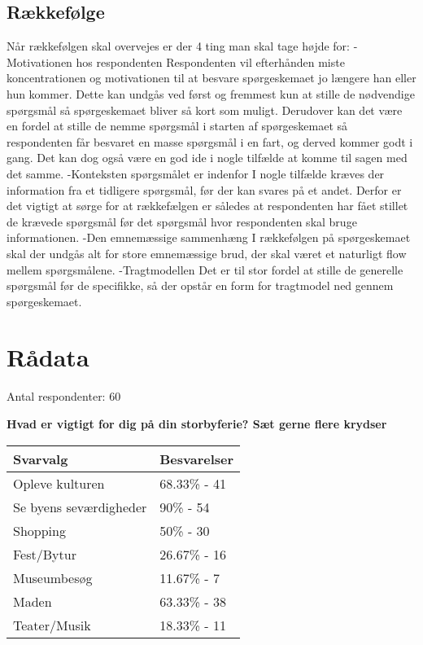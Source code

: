 \subsection{Rækkefølge}
Når rækkefølgen skal overvejes er der 4 ting man skal tage højde for: 
-Motivationen hos respondenten
Respondenten vil efterhånden miste koncentrationen og motivationen til at besvare spørgeskemaet jo længere han eller hun kommer. Dette kan undgås ved først og fremmest kun at stille de nødvendige spørgsmål så spørgeskemaet bliver så kort som muligt. Derudover kan det være en fordel at stille de nemme spørgsmål i starten af spørgeskemaet så respondenten får besvaret en masse spørgsmål i en fart, og derved kommer godt i gang. Det kan dog også være en god ide i nogle tilfælde at komme til sagen med det samme.
-Konteksten spørgsmålet er indenfor 
I nogle tilfælde kræves der information fra et tidligere spørgsmål, før der kan svares på et andet. Derfor er det vigtigt at sørge for at rækkefælgen er således at respondenten har fået stillet de krævede spørgsmål før det spørgsmål hvor respondenten skal bruge informationen.
-Den emnemæssige sammenhæng 
I rækkefølgen på spørgeskemaet skal der undgås alt for store emnemæssige brud, der skal været et naturligt flow mellem spørgsmålene.
-Tragtmodellen
Det er til stor fordel at stille de generelle spørgsmål før de specifikke, så der opstår en form for tragtmodel ned gennem spørgeskemaet.


\section{Rådata}
Antal respondenter: 60

\textbf{Hvad er vigtigt for dig på din storbyferie?
Sæt gerne flere krydser}

    \begin{tabular}{| l | l |}
    \hline
    Svarvalg & Besvarelser \\ \hline
    Opleve kulturen & 68.33\% - 41 \\ \hline
    Se byens seværdigheder & 90\% - 54 \\ \hline
    Shopping & 50\% - 30 \\ \hline
    Fest/Bytur & 26.67\% - 16 \\ \hline
    Museumbesøg & 11.67\% - 7 \\ \hline
    Maden & 63.33\% - 38 \\ \hline
    Teater/Musik & 18.33\% - 11 \\
    \hline
    \end{tabular}


